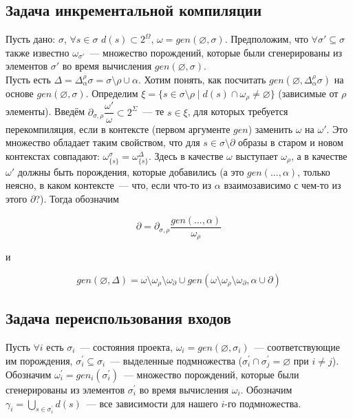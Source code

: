 



\subsection{Задача инкрементальной компиляции}

\newcommand{\Deltasigma}{\Delta_\alpha^\rho\sigma}

Пусть дано: $\sigma$, $\forall s \in \sigma$ $d(s) \subset 2^\Omega$, $\omega = gen(\varnothing, \sigma)$. Предположим, что $\forall \sigma' \subseteq \sigma$ также известно $\omega_{\sigma'}$~--- множество порождений, которые были сгенерированы из элементов $\sigma'$ во время вычисления $gen(\varnothing, \sigma)$.\\

Пусть есть $\Delta = \Deltasigma = \sigma\setminus\rho\cup\alpha$. Хотим понять, как посчитать $gen(\varnothing, \Deltasigma)$ на основе $gen(\varnothing, \sigma)$. Определим $\xi = \{s \in \sigma\setminus\rho \mid d(s) \cap \omega_\rho \neq \varnothing\}$ (зависимые от $\rho$ элементы). Введём $\partial_{\sigma, \rho}\dfrac{\omega'}{\omega} \subset 2^\Sigma$~--- те $s \in \xi$, для которых требуется перекомпиляция, если в контексте (первом аргументе $gen$) заменить $\omega$ на $\omega'$. Это множество обладает таким свойством, что для $s \in \sigma\setminus\partial$ образы в старом и новом контекстах совпадают: $\omega_{\{s\}}^\sigma = \omega_{\{s\}}^{\Delta}$. Здесь в качестве $\omega$ выступает $\omega_\rho$, а в качестве $\omega'$ должны быть порождения, которые добавились (а это $gen(..., \alpha)$, только неясно, в каком контексте~--- что, если что-то из $\alpha$ взаимозависимо с чем-то из этого $\partial$?). Тогда обозначим

$$\partial = \partial_{\sigma, \rho}\dfrac{gen(..., \alpha)}{\omega_\rho}$$

и

$$gen(\varnothing, \Delta) = \omega \setminus \omega_\rho \setminus \omega_\partial \cup gen(\omega \setminus \omega_\rho \setminus \omega_\partial, \alpha \cup \partial)$$

\subsection{Задача переиспользования входов}

Пусть $\forall i$ есть $\sigma_i$~--- состояния проекта, $\omega_i = gen(\varnothing, \sigma_i)$~--- соответствующие им порождения, $\sigma_i^\prime \subseteq \sigma_i$~--- выделенные подмножества ($\sigma_i^\prime \cap \sigma_j^\prime = \varnothing$ при $i \neq j$). Обозначим $\omega_i^\prime = gen_i(\sigma_i^\prime)$~--- множество порождений, которые были сгенерированы из элементов $\sigma_i^\prime$ во время вычисления $\omega_i$. Обозначим $\gamma_i = \bigcup\limits_{s \in \sigma_i^\prime} d(s)$~--- все зависимости для нашего $i$-го подмножества.

